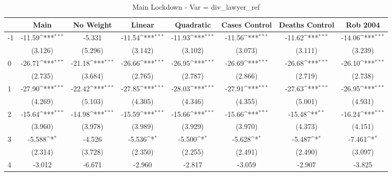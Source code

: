 \documentclass{article}
\begin{document}
{
\def\sym#1{\ifmmode^{#1}\else\(^{#1}\)\fi}
\begin{longtable}{l*{7}{c}}
\caption{Main Lockdown - Var = div\_lawyer\_ref}\\
\hline\hline\endfirsthead\hline\endhead\hline\endfoot\endlastfoot
                &\multicolumn{1}{c}{Main}&\multicolumn{1}{c}{No Weight}&\multicolumn{1}{c}{Linear}&\multicolumn{1}{c}{Quadratic}&\multicolumn{1}{c}{Cases Control}&\multicolumn{1}{c}{Deaths Control}&\multicolumn{1}{c}{Rob 2004}\\
\hline
-1              &   -11.59\sym{***}&   -5.331         &   -11.54\sym{***}&   -11.93\sym{***}&   -11.56\sym{***}&   -11.62\sym{***}&   -14.06\sym{***}\\
                &  (3.126)         &  (5.296)         &  (3.142)         &  (3.102)         &  (3.073)         &  (3.111)         &  (3.239)         \\
0               &   -26.71\sym{***}&   -21.18\sym{***}&   -26.66\sym{***}&   -26.95\sym{***}&   -26.69\sym{***}&   -26.68\sym{***}&   -26.10\sym{***}\\
                &  (2.735)         &  (3.684)         &  (2.765)         &  (2.787)         &  (2.866)         &  (2.719)         &  (2.738)         \\
1               &   -27.90\sym{***}&   -22.42\sym{***}&   -27.85\sym{***}&   -28.03\sym{***}&   -27.91\sym{***}&   -27.63\sym{***}&   -26.95\sym{***}\\
                &  (4.269)         &  (5.103)         &  (4.305)         &  (4.346)         &  (4.355)         &  (5.001)         &  (4.931)         \\
2               &   -15.64\sym{***}&   -14.98\sym{***}&   -15.59\sym{***}&   -15.66\sym{***}&   -15.66\sym{***}&   -15.48\sym{**} &   -16.24\sym{***}\\
                &  (3.960)         &  (3.978)         &  (3.989)         &  (3.929)         &  (3.970)         &  (4.373)         &  (4.151)         \\
3               &   -5.588\sym{*}  &   -4.526         &   -5.536\sym{*}  &   -5.500\sym{*}  &   -5.628\sym{*}  &   -5.487\sym{*}  &   -7.461\sym{*}  \\
                &  (2.314)         &  (3.728)         &  (2.350)         &  (2.255)         &  (2.491)         &  (2.490)         &  (3.097)         \\
4               &   -3.012         &   -6.671         &   -2.960         &   -2.817         &   -3.059         &   -2.907         &   -3.825         \\

\end{longtable}}
\end{document}
